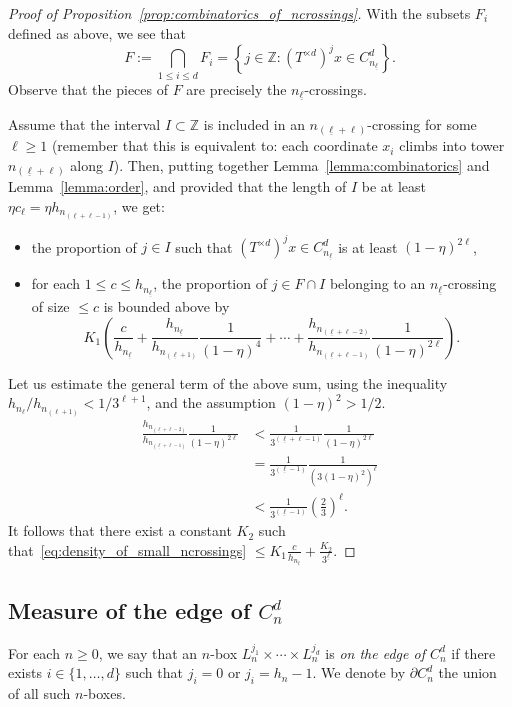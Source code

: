 \documentclass[AHL,Unicode,longabstracts]{cedram}
\newcommand{\egdef}{:=}
\newcommand{\ZZ}{\mathbb{Z}}
\newcommand{\cd}{C^{d}}
\newcommand{\td}{T^{\times d}}
\newcommand{\lb}{\underline{\ell}}
\begin{document}
\begin{proof}[Proof of Proposition~\ref{prop:combinatorics_of_ncrossings}]
With the subsets $F_i$ defined as above, we see that
\[
F\egdef\bigcap_{1\le i\le d}F_i = \left\{j\in\ZZ: (\td)^j x \in
\cd_{n_{\lb}} \right\}.
\]
Observe that the pieces of $F$ are precisely the $n_{\lb}$-crossings.

Assume that the interval $I\subset\ZZ$ is included in an $n_{(\lb+\ell)}$-crossing for some $\ell\ge1$ (remember that this is equivalent to: each coordinate $x_i$ climbs into tower $n_{(\lb+\ell)}$ along $I$). Then, putting together Lemma~\ref{lemma:combinatorics} and Lemma~\ref{lemma:order}, and provided that the length of $I$ be at least $\eta c_\ell=\eta h_{n_{(\lb+\ell-1)}}$, we get:
\begin{itemize}
\item the proportion of $j\in I$ such that $(\td)^j x \in \cd_{n_{\lb}}$ is at least $(1-\eta)^{2\ell}$,
\item for each $1\le c\le h_{n_{\lb}}$, the proportion of $j\in F\cap I$ belonging to an $n_{\lb}$-crossing of size $\le c$ is bounded above by
\begin{equation}\label{eq:density_of_small_ncrossings}
K_1 \left(
\frac{c}{h_{n_{\lb}}} + \frac{ h_{n_{\lb}} }{ h_{n_{(\lb+1)}} }
\frac{1}{(1-\eta)^4} + \cdots + \frac{ h_{n_{(\lb+\ell-2)}} }{ h_{n_{(\lb+\ell-1)}} }
\frac{1}{(1-\eta)^{2\ell}}
\right).
\end{equation}
\end{itemize}
Let us estimate the general term of the above sum, using the inequality $h_{n_\ell}/h_{n_{(\ell+1)}}<1/3^{\ell+1}$, and the assumption $(1-\eta)^2>1/2$.
\begin{align*}
\frac{ h_{n_{(\lb+\ell-2)}} }{ h_{n_{(\lb+\ell-1)}} }
\frac{1}{(1-\eta)^{2\ell}} & < \frac{1}{3^{(\lb+\ell-1)}} \frac{1}{(1-\eta)^{2\ell}}\\
& = \frac{1}{3^{(\lb -1)}} \frac{1}{\left(3 (1-\eta)^2
\right)^\ell}\\
& < \frac{1}{3^{(\lb -1)}} \left(\frac{2}{3}\right)^\ell.
\end{align*}
It follows that there exist a constant $K_2$ such that~\eqref{eq:density_of_small_ncrossings} $\le K_1 \frac{c}{h_{n_{\lb}}} + \frac{K_2}{3^{\lb}}$.
\end{proof}

\subsection{Measure of the edge of \texorpdfstring{$\cd_n$}{cdn}}\label{sec:edge}
For each $n\ge0$, we say that an $n$-box $L_n^{j_1}\times\cdots\times L_n^{j_d}$ is \emph{on the edge of $\cd_n$} if there exists $i\in\{1,\ldots,d\}$ such that $j_i=0$ or $j_i=h_n-1$. We denote by $\partial \cd_n$ the union of all such $n$-boxes.
\end{document}
